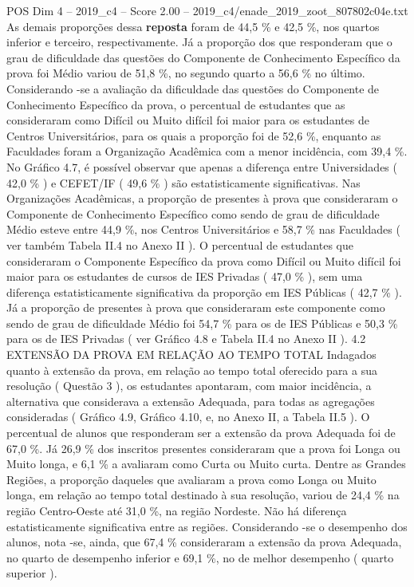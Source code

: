 \begin{textsample}{POS Dim 4 – 2019\_c4 – Score 2.00 – 2019\_c4/enade\_2019\_zoot\_807802c04e.txt}
As demais proporções dessa \textbf{reposta} foram de 44,5 \% e 42,5 \%, nos quartos inferior e terceiro, respectivamente.
Já a proporção dos que responderam que o grau de dificuldade das questões do Componente de Conhecimento Específico da prova foi Médio variou de 51,8 \%, no segundo quarto a 56,6 \% no último.
Considerando -se a avaliação da dificuldade das questões do Componente de Conhecimento Específico da prova, o percentual de estudantes que as consideraram como Difícil ou Muito difícil foi maior para os estudantes de Centros Universitários, para os quais a proporção foi de 52,6 \%, enquanto as Faculdades foram a Organização Acadêmica com a menor incidência, com 39,4 \%.
No Gráfico 4.7, é possível observar que apenas a diferença entre Universidades ( 42,0 \% ) e CEFET/IF ( 49,6 \% ) são estatisticamente significativas.
Nas Organizações Acadêmicas, a proporção de presentes à prova que consideraram o Componente de Conhecimento Específico como sendo de grau de dificuldade Médio esteve entre 44,9 \%, nos Centros Universitários e 58,7 \% nas Faculdades ( ver também Tabela II.4 no Anexo II ).
O percentual de estudantes que consideraram o Componente Específico da prova como Difícil ou Muito difícil foi maior para os estudantes de cursos de IES Privadas ( 47,0 \% ), sem uma diferença estatisticamente significativa da proporção em IES Públicas ( 42,7 \% ).
Já a proporção de presentes à prova que consideraram este componente como sendo de grau de dificuldade Médio foi 54,7 \% para os de IES Públicas e 50,3 \% para os de IES Privadas ( ver Gráfico 4.8 e Tabela II.4 no Anexo II ). 4.2 EXTENSÃO DA PROVA EM RELAÇÃO AO TEMPO TOTAL Indagados quanto à extensão da prova, em relação ao tempo total oferecido para a sua resolução ( Questão 3 ), os estudantes apontaram, com maior incidência, a alternativa que considerava a extensão Adequada, para todas as agregações consideradas ( Gráfico 4.9, Gráfico 4.10, e, no Anexo II, a Tabela II.5 ).
O percentual de alunos que responderam ser a extensão da prova Adequada foi de 67,0 \%.
Já 26,9 \% dos inscritos presentes consideraram que a prova foi Longa ou Muito longa, e 6,1 \% a avaliaram como Curta ou Muito curta.
Dentre as Grandes Regiões, a proporção daqueles que avaliaram a prova como Longa ou Muito longa, em relação ao tempo total destinado à sua resolução, variou de 24,4 \% na região Centro-Oeste até 31,0 \%, na região Nordeste.
Não há diferença estatisticamente significativa entre as regiões.
Considerando -se o desempenho dos alunos, nota -se, ainda, que 67,4 \% consideraram a extensão da prova Adequada, no quarto de desempenho inferior e 69,1 \%, no de melhor desempenho ( quarto superior ).

\end{textsample}
